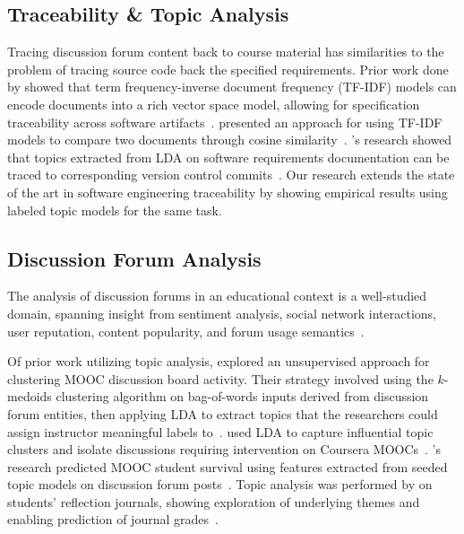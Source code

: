 \documentclass[sigconf, nonacm=true]{acmart}
\begin{document}
\subsection{Traceability \& Topic Analysis}
Tracing discussion forum content back to course material has similarities to the problem of tracing source code back the specified requirements.
Prior work done by \citeauthor{4556122} showed that term frequency-inverse document frequency (TF-IDF) models can encode documents into a rich vector space model, allowing for specification traceability across software artifacts~\cite{4556122}.
\citeauthor{Tata:2007:EST:1328854.1328855} presented an approach for using TF-IDF models to compare two documents through cosine similarity~\cite{Tata:2007:EST:1328854.1328855}.
\citeauthor{hindle2012relating}'s research showed that topics extracted from LDA on software requirements documentation can be traced to corresponding version control commits~\cite{hindle2012relating}.
Our research extends the state of the art in software engineering traceability by showing empirical results using labeled topic models for the same task.


\subsection{Discussion Forum Analysis}
The analysis of discussion forums in an educational context is a well-studied domain, spanning insight from sentiment analysis, social network interactions, user reputation, content popularity, and forum usage semantics~\cite{wen2014sentiment,wong2015analysis,coetzee2014should,breslow2013studying,onah2014exploring}.

Of prior work utilizing topic analysis, \citeauthor{ezen2015unsupervised} explored an unsupervised approach for clustering MOOC discussion board activity. Their strategy involved using the $k$-medoids clustering algorithm on bag-of-words inputs derived from discussion forum entities, then applying LDA to extract topics that the researchers could assign instructor meaningful labels to~\cite{ezen2015unsupervised}.
\citeauthor{atapattu2016topic} used LDA to capture influential topic clusters and isolate discussions requiring intervention on Coursera MOOCs~\cite{atapattu2016topic}.
\citeauthor{ramesh2014understanding}'s research predicted MOOC student survival using features extracted from seeded topic models on discussion forum posts~\cite{ramesh2014understanding}.
Topic analysis was performed by \citeauthor{Chen:2016:TME:2883851.2883951} on students' reflection journals, showing exploration of underlying themes and enabling prediction of journal grades~\cite{Chen:2016:TME:2883851.2883951}.
\end{document}
